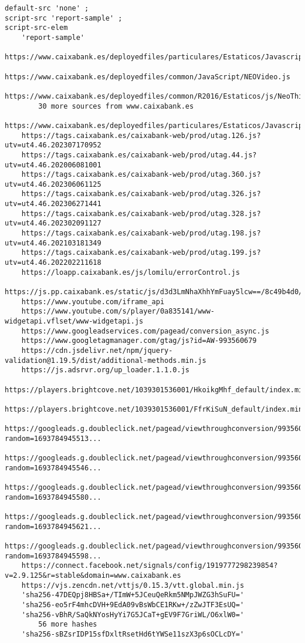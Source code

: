 \begin{verbatim}
default-src 'none' ; 
script-src 'report-sample' ; 
script-src-elem
	'report-sample'
	https://www.caixabank.es/deployedfiles/particulares/Estaticos/Javascript/s_code_basic.js
	https://www.caixabank.es/deployedfiles/common/JavaScript/NEOVideo.js
	https://www.caixabank.es/deployedfiles/common/R2016/Estaticos/js/NeoThirdParty2.js
		30 more sources from www.caixabank.es
	https://www.caixabank.es/deployedfiles/particulares/Estaticos/Javascript/custom.forms.jquery.js
	https://tags.caixabank.es/caixabank-web/prod/utag.126.js?utv=ut4.46.202307170952
	https://tags.caixabank.es/caixabank-web/prod/utag.44.js?utv=ut4.46.202006081001
	https://tags.caixabank.es/caixabank-web/prod/utag.360.js?utv=ut4.46.202306061125
	https://tags.caixabank.es/caixabank-web/prod/utag.326.js?utv=ut4.46.202306271441
	https://tags.caixabank.es/caixabank-web/prod/utag.328.js?utv=ut4.46.202302091127
	https://tags.caixabank.es/caixabank-web/prod/utag.198.js?utv=ut4.46.202103181349
	https://tags.caixabank.es/caixabank-web/prod/utag.199.js?utv=ut4.46.202202211618
	https://loapp.caixabank.es/js/lomilu/errorControl.js
	https://js.pp.caixabank.es/static/js/d3d3LmNhaXhhYmFuay5lcw==/8c49b4d0/bcaptcha.js
	https://www.youtube.com/iframe_api
	https://www.youtube.com/s/player/0a835141/www-widgetapi.vflset/www-widgetapi.js
	https://www.googleadservices.com/pagead/conversion_async.js
	https://www.googletagmanager.com/gtag/js?id=AW-993560679
	https://cdn.jsdelivr.net/npm/jquery-validation@1.19.5/dist/additional-methods.min.js
	https://js.adsrvr.org/up_loader.1.1.0.js
	https://players.brightcove.net/1039301536001/HkoikgMhf_default/index.min.js
	https://players.brightcove.net/1039301536001/FfrKiSuN_default/index.min.js
	https://googleads.g.doubleclick.net/pagead/viewthroughconversion/993560679/?random=1693784945513...
	https://googleads.g.doubleclick.net/pagead/viewthroughconversion/993560679/?random=1693784945546...
	https://googleads.g.doubleclick.net/pagead/viewthroughconversion/993560679/?random=1693784945580...
	https://googleads.g.doubleclick.net/pagead/viewthroughconversion/993560679/?random=1693784945621...
	https://googleads.g.doubleclick.net/pagead/viewthroughconversion/993560679/?random=1693784945598...
	https://connect.facebook.net/signals/config/1919777298239854?v=2.9.125&r=stable&domain=www.caixabank.es
	https://vjs.zencdn.net/vttjs/0.15.3/vtt.global.min.js
	'sha256-47DEQpj8HBSa+/TImW+5JCeuQeRkm5NMpJWZG3hSuFU='
	'sha256-eo5rF4mhcDVH+9EdA09vBsWbCE1RKw+/zZwJTF3EsUQ='
	'sha256-vBhR/SaQkNYosHyYi7G5JCaT+gEV9F7GriWL/O6xlW0='
		56 more hashes
	'sha256-sBZsrIDP15sfDxltRsetHd6tYWSe11szX3p6sOCLcDY='

\end{verbatim}
